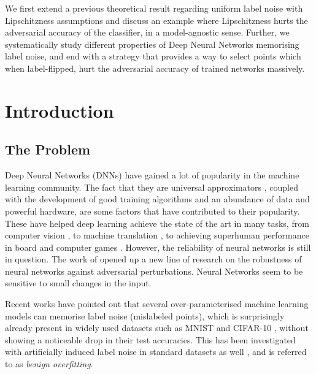 \documentclass{ociamthesis}
\begin{document}
We first extend a previous theoretical result regarding uniform label noise with
Lipschitzness assumptions and discuss an example where Lipschitzness hurts the
adversarial accuracy of the classifier, in a model-agnostic sense. Further, we
systematically study different properties of Deep Neural Networks memorising
label noise, and end with a strategy that provides a way to select points which
when label-flipped, hurt the adversarial accuracy of trained networks massively.

\tableofcontents

\chapter{Introduction}

\section{The Problem}

Deep Neural Networks (DNNs) have gained a lot of popularity in the machine
learning community. The fact that they are universal approximators
\citep{hornik1989multilayer}, coupled with the development of good training
algorithms and an abundance of data and powerful hardware, are some factors that
have contributed to their popularity. These have helped deep learning achieve
the state of the art in many tasks, from computer vision \citep{imagenet}, to
machine translation \citep{seq2seq,attention-is-all-you-need}, to achieving
superhuman performance in board and computer games \citep{alpha-zero,
starcraft}. However, the reliability of neural networks is still in question.
The work of \citet{42503} opened up a new line of research on the robustness of
neural networks against adversarial perturbations. Neural Networks seem to be
sensitive to small changes in the input.

Recent works \citep{belkin2018understand,DBLP:journals/cacm/ZhangBHRV21} have
pointed out that several over-parameterised machine learning models can memorise
label noise (mislabeled points), which is surprisingly already present in widely
used datasets \citep{sanyal2021how} such as MNIST
\citep{lecun-mnisthandwrittendigit-2010} and CIFAR-10
\citep{Krizhevsky09learningmultiple}, without showing a noticeable drop in their
test accuracies. This has been investigated with artificially induced label
noise in standard datasets as well \citep{DBLP:journals/cacm/ZhangBHRV21}, and
is referred to as \emph{benign overfitting}.
\end{document}
